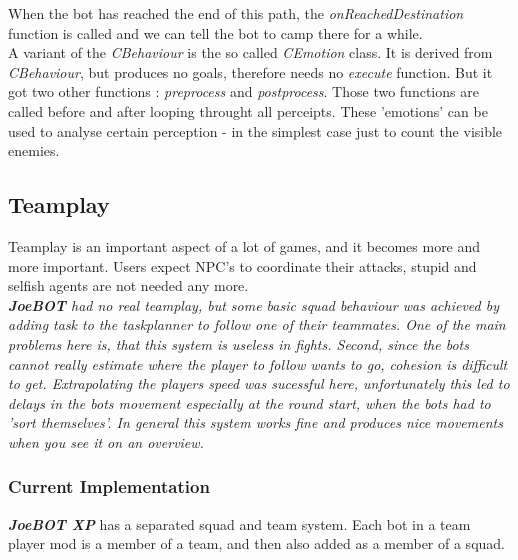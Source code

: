\documentclass[12pt]{article}
\newcommand {\joebotxp}{\textit{\textbf{JoeBOT XP}} }
\newcommand {\joebot}{\textit{\textbf{JoeBOT}} }
\begin{document}
When the bot has reached the end of this path, the \textit{onReachedDestination} function is called and we can tell the bot to camp there for a while.\\
A variant of the \textit{CBehaviour} is the so called \textit{CEmotion} class. It is derived from \textit{CBehaviour}, but produces no goals, therefore needs no \textit{execute} function. But it got two other functions : \textit{preprocess} and \textit{postprocess}. Those two functions are called before and after looping throught all perceipts. These 'emotions' can be used to analyse certain perception - in the simplest case just to count the visible enemies.

\subsection{Teamplay}

Teamplay is an important aspect of a lot of games, and it becomes more and more important. Users expect NPC's to coordinate their attacks, stupid and selfish agents are not needed any more.\\
\textit{\joebot had no real teamplay, but some basic squad behaviour was achieved by adding task to the taskplanner to follow one of their teammates. One of the main problems here is, that this system is useless in fights. Second, since the bots cannot really estimate where the player to follow wants to go, cohesion is difficult to get. Extrapolating the players speed was sucessful here, unfortunately this led to delays in the bots movement especially at the round start, when the bots had to 'sort themselves'. In general this system works fine and produces nice movements when you see it on an overview.}
\subsubsection{Current Implementation}
\joebotxp has a separated squad and team system. Each bot in a team player mod is a member of a team, and then also added as a member of a squad.
\end{document}
